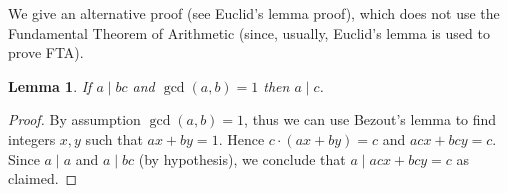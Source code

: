 \documentclass[12pt]{article}
\newtheorem{lemma}{Lemma}
\begin{document}
We give an alternative proof (see Euclid's lemma proof), which does not use the Fundamental Theorem of Arithmetic (since, usually, Euclid's lemma is used to prove FTA).

\begin{lemma}
If $a\mid bc$ and $\gcd(a,b)=1$ then $a\mid c$.
\end{lemma}
\begin{proof}
By assumption $\gcd(a,b)=1$, thus we can use Bezout's lemma to find integers $x,y$ such that $ax+by=1$. Hence $c\cdot(ax+by)=c$ and $acx+bcy=c$. Since $a\mid a$ and $a \mid bc $ (by hypothesis), we conclude that $a \mid acx + bcy =c $ as claimed.
\end{proof}
\end{document}
